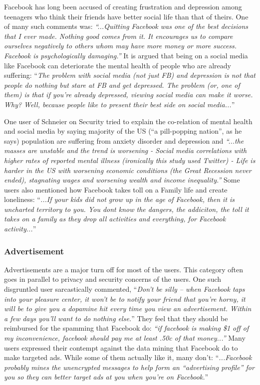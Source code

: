     Facebook has long been accused of creating frustration and depression among teenagers who think their friends have better social life than that of theirs. One of many such comments was: \textit{``...Quitting Facebook was one of the best decisions that I ever made. Nothing good comes from it. It encourages us to compare ourselves negatively to others whom may have more money or more success. Facebook is psychologically damaging.''} It is argued that being on a social media like Facebook can deteriorate the mental health of people who are already suffering: ``\textit{The problem with social media (not just FB) and depression is not that people do nothing but stare at FB and get depressed. The problem (or, one of them) is that if you're already depressed, viewing social media can make it worse. Why? Well, because people like to present their best side on social media...}''
    
    One user of Schneier on Security tried to explain the co-relation of mental health and social media by saying majority of the US (``a pill-popping nation'', as he says) population are suffering from anxiety disorder and depression and \textit{``...the masses are unstable and the trend is worsening - Social media correlations with higher rates of reported mental illness (ironically this study used Twitter) - Life is harder in the US with worsening economic conditions (the Great Recession never ended), stagnating wages and worsening wealth and income inequality.''} Some users also mentioned how Facebook takes toll on a Family life and create loneliness: ``\textit{...If your kids did not grow up in the age of Facebook, then it is uncharted territory to you. You dont know the dangers, the addiciton, the toll it takes on a family as they drop all activities and everything, for Facebook activity...}''
    
 \subsubsection{Advertisement}
 Advertisements are a major turn off for most of the users. This category often goes in parallel to privacy and security concerns of the users. One such disgruntled user sarcastically commented, ``\textit{Don't be silly -- when Facebook taps into your pleasure center, it won't be to notify your friend that you're horny, it will be to give you a dopamine hit every time you view an advertisement. Within a few days you'll want to do nothing else.}'' They feel that they should be reimbursed for the spamming that Facebook do: \textit{``if facebook is making \$1 off of my inconvenience, facebook should pay me at least .50c of that money...''} Many users expressed their contempt against the data mining that Facebook do to make targeted ads. While some of them actually like it, many don't: ``\textit{...Facebook probably mines the unencrypted messages to help form an ``advertising profile'' for you so they can better target ads at you when you're on Facebook.}''
    
